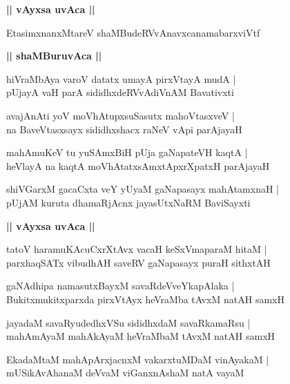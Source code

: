 \documentclass[twoside,12pt,openright]{book}
\newcounter{shloka}[chapter]
\def\uvaca#1{\centerline{{\large\textbf{#1}}}}
\begin{document}
\uvaca{||  vAyxsa uvAca ||}

\begin{shloka}%
EtasimxnanxMtareV shaMBudeRVvAnavxcanamabarxviVtf 
\end{shloka}

\uvaca{|| shaMBuruvAca ||}

\begin{shloka}%
hiVraMbAya varoV datatx umayA pirxVtayA mudA |\\
pUjayA vaH parA sididhxdeRVvAdiVnAM Bavativxti
\end{shloka}

\begin{shloka}%
avajAnAti yoV moVhAtupxsuSasutx mahoVtasxveV |\\
na BaveVtasxsayx sididhxshacx raNeV vApi parAjayaH
\end{shloka}

\begin{shloka}%
mahAmuKeV tu yuSAmxBiH pUja gaNapateVH kaqtA |\\
heVlayA na kaqtA moVhAtatxsAmxtApxrXpatxH parAjayaH 
\end{shloka}

\begin{shloka}%
shiVGarxM gacaCxta veY yUyaM gaNapasayx mahAtamxnaH |\\
pUjAM kuruta dhamaRjAcnx jayasUtxNaRM BaviSayxti
\end{shloka}

\uvaca{|| vAyxsa uvAca ||}

\begin{shloka}%
tatoV haramuKAcuCxrXtAvx vacaH keSxVmaparaM hitaM |\\
parxhaqSATx vibudhAH saveRV gaNapasayx puraH sithxtAH 
\end{shloka}

\begin{shloka}%
gaNAdhipa namasutxBayxM savaRdeVveYkapAlaka |\\
Bukitxmukitxparxda pirxVtAyx heVraMba tAvxM natAH samxH 
\end{shloka}

\begin{shloka}%
jayadaM savaRyudedhxVSu sididhxdaM savaRkamaRsu |\\
mahAmAyaM mahAkAyaM heVraMbaM tAvxM natAH samxH 
\end{shloka}

\begin{shloka}%
EkadaMtaM mahApArxjacnxM vakarxtuMDaM vinAyakaM |\\
mUSikAvAhanaM deVvaM viGanxnAshaM natA vayaM 
\end{shloka}
\end{document}
